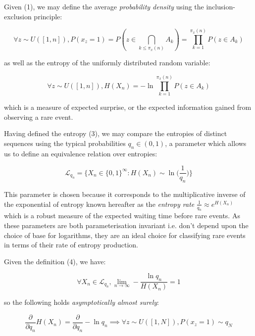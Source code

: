 \documentclass{article}
\begin{document}
Given (1), we may define the average \textit{probability density} using the inclusion-exclusion principle:

\begin{equation}
\forall z \sim U([1,n]), P(x_z =1) = P(z \in \bigcap_{k \leq \pi_x(n)} A_k) = \prod_{k=1}^{\pi_x(n)} P(z \in A_k)
\end{equation}

as well as the entropy of the uniformly distributed random variable:

\begin{equation}
\forall z \sim U([1,n]), H(X_n) = -\ln \prod_{k=1}^{\pi_x(n)} P(z \in A_k)
\end{equation}

which is a measure of expected surprise, or the expected information gained from observing a rare event.

\newpage 

Having defined the entropy (3), we may compare the entropies of distinct sequences using the typical probabilities
$q_n \in (0,1)$, a parameter which allows us to define an equivalence relation over entropies:

\begin{equation}
\mathcal{L}_{q_n} = \{X_n \in \{0,1\}^{\infty}: H(X_n) \sim \ln \big(\frac{1}{q_n}\big) \}
\end{equation}

This parameter is chosen because it corresponds to the multiplicative inverse of the exponential of entropy known hereafter as the \textit{entropy rate} $\frac{1}{q_n} \approx e^{H(X_n)}	$ which is a robust measure of the expected waiting time before rare events. As these parameters are both parameterisation invariant i.e. don't depend upon the choice of base for logarithms, they are an ideal choice for classifying rare events in terms of their rate of entropy production. 

Given the definition (4), we have:

\begin{equation}
\forall X_n \in \mathcal{L}_{q_n}, \lim_{n \to \infty} -\frac{\ln q_n}{H(X_n)} = 1
\end{equation}

so the following holds \textit{asymptotically almost surely}: 

\begin{equation}
\frac{\partial}{\partial q_n} H(X_n) = \frac{\partial}{\partial q_n} -\ln q_n \implies \forall z \sim U([1,N]), P(x_z = 1) \sim q_N
\end{equation} 
\end{document}
